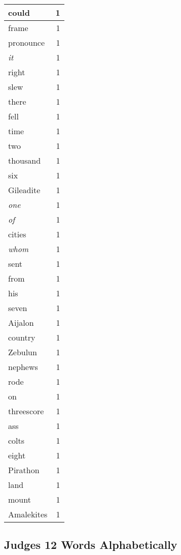 \begin{center}
\begin{longtable}{l|r}
could & 1\\ \hline 
frame & 1\\ \hline 
pronounce & 1\\ \hline 
\emph{it} & 1\\ \hline 
right & 1\\ \hline 
slew & 1\\ \hline 
there & 1\\ \hline 
fell & 1\\ \hline 
time & 1\\ \hline 
two & 1\\ \hline 
thousand & 1\\ \hline 
six & 1\\ \hline 
Gileadite & 1\\ \hline 
\emph{one} & 1\\ \hline 
\emph{of} & 1\\ \hline 
cities & 1\\ \hline 
\emph{whom} & 1\\ \hline 
sent & 1\\ \hline 
from & 1\\ \hline 
his & 1\\ \hline 
seven & 1\\ \hline 
Aijalon & 1\\ \hline 
country & 1\\ \hline 
Zebulun & 1\\ \hline 
nephews & 1\\ \hline 
rode & 1\\ \hline 
on & 1\\ \hline 
threescore & 1\\ \hline 
ass & 1\\ \hline 
colts & 1\\ \hline 
eight & 1\\ \hline 
Pirathon & 1\\ \hline 
land & 1\\ \hline 
mount & 1\\ \hline 
Amalekites & 1\\ \hline 
\end{longtable}
\end{center}





\subsection{Judges 12 Words Alphabetically}


